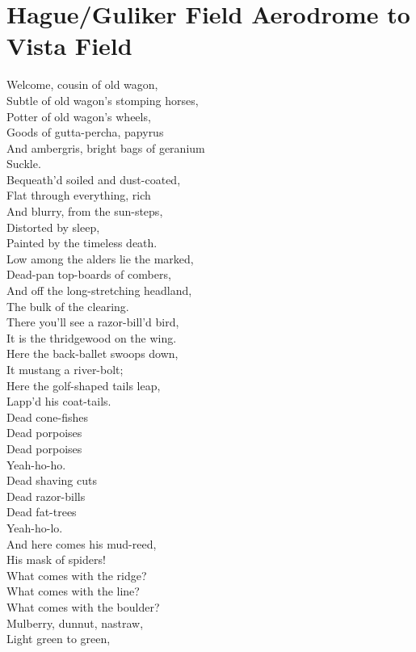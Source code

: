 \documentclass[smalldemyvopaper,11pt,twoside,onecolumn,openright,extrafontsizes]{memoir}
\begin{document}
\chapter{Hague/Guliker Field Aerodrome to Vista Field}
Welcome, cousin of old wagon,
\\Subtle of old wagon's stomping horses,
\\Potter of old wagon's wheels,
\\Goods of gutta-percha, papyrus
\\And ambergris, bright bags of geranium
\\Suckle.
\\Bequeath'd soiled and dust-coated,
\\Flat through everything, rich
\\And blurry, from the sun-steps,
\\Distorted by sleep,
\\Painted by the timeless death.
\\Low among the alders lie the marked,
\\Dead-pan top-boards of combers,
\\And off the long-stretching headland,
\\The bulk of the clearing.
\\There you'll see a razor-bill'd bird,
\\It is the thridgewood on the wing.
\\Here the back-ballet swoops down,
\\It mustang a river-bolt;
\\Here the golf-shaped tails leap,
\\Lapp'd his coat-tails.
\\Dead cone-fishes
\\Dead porpoises
\\Dead porpoises
\\Yeah-ho-ho.
\\Dead shaving cuts
\\Dead razor-bills
\\Dead fat-trees
\\Yeah-ho-lo.
\\And here comes his mud-reed,
\\His mask of spiders!
\\What comes with the ridge?
\\What comes with the line?
\\What comes with the boulder?
\\Mulberry, dunnut, nastraw,
\\Light green to green,
\end{document}
